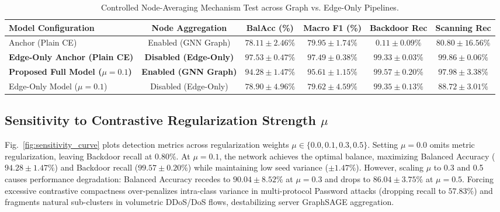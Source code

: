 \documentclass[12pt,a4paper]{report}
\begin{document}
\begin{table}[H]
\centering
\caption{Controlled Node-Averaging Mechanism Test across Graph vs. Edge-Only Pipelines.}
\label{tab:node_averaging_test}
\small
\begin{tabularx}{\textwidth}{>{\raggedright\arraybackslash}X c c c c c}
\toprule
\textbf{Model Configuration} & \textbf{Node Aggregation} & \textbf{BalAcc (\%)} & \textbf{Macro F1 (\%)} & \textbf{Backdoor Rec} & \textbf{Scanning Rec} \\
\midrule
Anchor (Plain CE) & Enabled (GNN Graph) & $78.11 \pm 2.46\%$ & $79.95 \pm 1.74\%$ & $0.11 \pm 0.09\%$ & $80.80 \pm 16.56\%$ \\
\textbf{Edge-Only Anchor (Plain CE)} & \textbf{Disabled (Edge-Only)} & $\mathbf{97.53 \pm 0.47\%}$ & $\mathbf{97.49 \pm 0.38\%}$ & $\mathbf{99.33 \pm 0.03\%}$ & $\mathbf{99.86 \pm 0.06\%}$ \\
\textbf{Proposed Full Model ($\mu=0.1$)} & \textbf{Enabled (GNN Graph)} & $\mathbf{94.28 \pm 1.47\%}$ & $\mathbf{95.61 \pm 1.15\%}$ & $\mathbf{99.57 \pm 0.20\%}$ & $\mathbf{97.98 \pm 3.38\%}$ \\
Edge-Only Model ($\mu=0.1$) & Disabled (Edge-Only) & $78.90 \pm 4.96\%$ & $79.62 \pm 4.59\%$ & $99.35 \pm 0.13\%$ & $88.72 \pm 3.01\%$ \\
\bottomrule
\end{tabularx}
\end{table}

\subsection{Sensitivity to Contrastive Regularization Strength $\mu$}
Fig.~\ref{fig:sensitivity_curve} plots detection metrics across regularization weights $\mu \in \{0.0, 0.1, 0.3, 0.5\}$. Setting $\mu = 0.0$ omits metric regularization, leaving Backdoor recall at $0.80\%$. At $\mu = 0.1$, the network achieves the optimal balance, maximizing Balanced Accuracy ($94.28 \pm 1.47\%$) and Backdoor recall ($99.57 \pm 0.20\%$) while maintaining low seed variance ($\pm 1.47\%$). However, scaling $\mu$ to 0.3 and 0.5 causes performance degradation: Balanced Accuracy recedes to $90.04 \pm 8.52\%$ at $\mu = 0.3$ and drops to $86.04 \pm 3.75\%$ at $\mu = 0.5$. Forcing excessive contrastive compactness over-penalizes intra-class variance in multi-protocol Password attacks (dropping recall to $57.83\%$) and fragments natural sub-clusters in volumetric DDoS/DoS flows, destabilizing server GraphSAGE aggregation.
\end{document}
